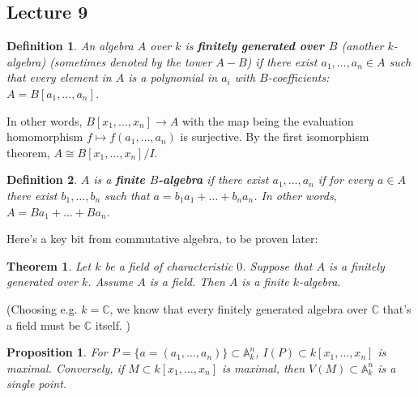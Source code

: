 \documentclass[12pt]{article}
\newcommand{\C}{\mathbb{C}}
\newcommand{\A}{\mathbb{A}}
\newtheorem{definition}{Definition}[section]
\newtheorem{theorem}{Theorem}[section]
\newtheorem{proposition}{Proposition}[section]
\begin{document}
    \subsection{Lecture 9}
    \begin{definition}
        An algebra $A$ over $k$ is \textbf{finitely generated over $B$} (another $k$-algebra) (sometimes denoted by the tower $A - B$) if there exist $a_1, \dots, a_n \in A$ such that every element in $A$ is a polynomial in $a_i$ with $B$-coefficients: $A = B[a_1, \dots, a_n]$.  
    \end{definition}
    In other words, $B[x_1, \dots, x_n] \to A$ with the map being the evaluation homomorphism $f \mapsto f(a_1, \dots, a_n)$ is surjective. By the first isomorphism theorem, $A \cong B[x_1, \dots, x_n]/I$.
    \begin{definition}
        $A$ is a \textbf{finite $B$-algebra} if there exist $a_1, \dots, a_n$ if for every $a \in A$ there exist $b_1, \dots, b_n$ such that $a = b_1a_1 + \dots + b_na_n$. In other words, $A = Ba_1 + \dots + Ba_n$. 
    \end{definition}
    Here's a key bit from commutative algebra, to be proven later:
    \begin{theorem} \label{thm:fin_if_fin_alg}
        Let $k$ be a field of characteristic $0$. Suppose that $A$ is a finitely generated over $k$. Assume $A$ is a field. Then $A$ is a finite $k$-algebra. 
    \end{theorem}
    (Choosing e.g. $k = \C$, we know that every finitely generated algebra over $\C$ that's a field must be $\C$ itself. )\par
    \begin{proposition}
        For $P = \{a = (a_1, \dots, a_n)\} \subset \A^n_k$, $I(P) \subset k[x_1, \dots, x_n]$ is maximal. Conversely, if $M \subset k[x_1, \dots, x_n]$ is maximal, then $V(M) \subset \A^n_k$ is a single point.
    \end{proposition}
\end{document}
